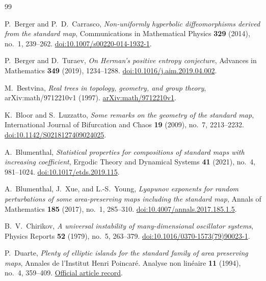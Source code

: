 \begin{thebibliography}{99}

P.~Berger and P.~D.~Carrasco,
\emph{Non-uniformly hyperbolic diffeomorphisms derived from the standard map},
Communications in Mathematical Physics \textbf{329} (2014), no.~1, 239--262.
\href{https://doi.org/10.1007/s00220-014-1932-1}
{doi:10.1007/s00220-014-1932-1}.

P.~Berger and D.~Turaev,
\emph{On Herman's positive entropy conjecture},
Advances in Mathematics \textbf{349} (2019), 1234--1288.
\href{https://doi.org/10.1016/j.aim.2019.04.002}
{doi:10.1016/j.aim.2019.04.002}.

M.~Bestvina,
\emph{Real trees in topology, geometry, and group theory},
arXiv:math/9712210v1 (1997).
\href{https://arxiv.org/abs/math/9712210v1}{arXiv:math/9712210v1}.

K.~Bloor and S.~Luzzatto,
\emph{Some remarks on the geometry of the standard map},
International Journal of Bifurcation and Chaos \textbf{19} (2009),
no.~7, 2213--2232.
\href{https://doi.org/10.1142/S0218127409024025}
{doi:10.1142/S0218127409024025}.

A.~Blumenthal,
\emph{Statistical properties for compositions of standard maps with increasing coefficient},
Ergodic Theory and Dynamical Systems \textbf{41} (2021), no.~4, 981--1024.
\href{https://doi.org/10.1017/etds.2019.115}{doi:10.1017/etds.2019.115}.

A.~Blumenthal, J.~Xue, and L.-S.~Young,
\emph{Lyapunov exponents for random perturbations of some area-preserving
maps including the standard map},
Annals of Mathematics \textbf{185} (2017), no.~1, 285--310.
\href{https://doi.org/10.4007/annals.2017.185.1.5}
{doi:10.4007/annals.2017.185.1.5}.

B.~V.~Chirikov,
\emph{A universal instability of many-dimensional oscillator systems},
Physics Reports \textbf{52} (1979), no.~5, 263--379.
\href{https://doi.org/10.1016/0370-1573(79)90023-1}
{doi:10.1016/0370-1573(79)90023-1}.

P.~Duarte,
\emph{Plenty of elliptic islands for the standard family of area preserving maps},
Annales de l'Institut Henri Poincar\'e. Analyse non lin\'eaire
\textbf{11} (1994), no.~4, 359--409.
\href{https://www.numdam.org/item/AIHPC_1994__11_4_359_0/}
{Official article record}.


\end{thebibliography}
